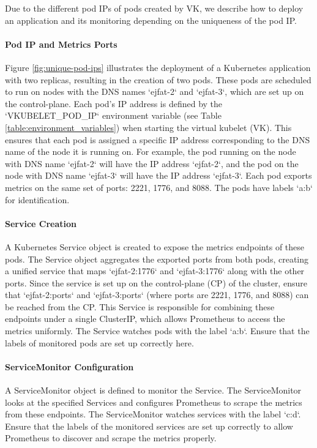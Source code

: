 Due to the different pod IPs of pods created by VK, we describe how to deploy an application and its monitoring depending on the uniqueness of the pod IP.

\paragraph{Pod IP and Metrics Ports}
Figure \ref{fig:unique-pod-ips} illustrates the deployment of a Kubernetes application with two replicas, resulting in the creation of two pods. These pods are scheduled to run on nodes with the DNS names `ejfat-2` and `ejfat-3`, which are set up on the control-plane. Each pod's IP address is defined by the `VKUBELET\_POD\_IP` environment variable (see Table \ref{table:environment_variables}) when starting the virtual kubelet (VK). This ensures that each pod is assigned a specific IP address corresponding to the DNS name of the node it is running on. For example, the pod running on the node with DNS name `ejfat-2` will have the IP address `ejfat-2`, and the pod on the node with DNS name `ejfat-3` will have the IP address `ejfat-3`. Each pod exports metrics on the same set of ports: 2221, 1776, and 8088. The pods have labels `a:b` for identification.

\paragraph{Service Creation}
A Kubernetes Service object is created to expose the metrics endpoints of these pods. The Service object aggregates the exported ports from both pods, creating a unified service that maps `ejfat-2:1776` and `ejfat-3:1776` along with the other ports. Since the service is set up on the control-plane (CP) of the cluster, ensure that `ejfat-2:ports` and `ejfat-3:ports` (where ports are 2221, 1776, and 8088) can be reached from the CP. This Service is responsible for combining these endpoints under a single ClusterIP, which allows Prometheus to access the metrics uniformly. The Service watches pods with the label `a:b`. Ensure that the labels of monitored pods are set up correctly here.

\paragraph{ServiceMonitor Configuration}
A ServiceMonitor object is defined to monitor the Service. The ServiceMonitor looks at the specified Services and configures Prometheus to scrape the metrics from these endpoints. The ServiceMonitor watches services with the label `c:d`. Ensure that the labels of the monitored services are set up correctly to allow Prometheus to discover and scrape the metrics properly.

